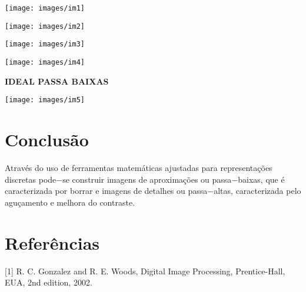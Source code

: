 \documentclass[conference]{IEEEtran}
\begin{document}
		\vspace{2\baselineskip}\vspace{-\parskip}
		\begin{minipage}{\linewidth}
  		\centering
  		\texttt{[image: images/im1]}
		\end{minipage}
		

		\begin{minipage}{\linewidth}
  		\centering
  		\texttt{[image: images/im2]}
		\end{minipage}
 		

		\begin{minipage}{\linewidth}
  		\centering
  		\texttt{[image: images/im3]}
		\end{minipage}
 		
 
		\begin{minipage}{\linewidth}
  		\centering
  		\texttt{[image: images/im4]}
		\end{minipage}		
 		
\centering
\textbf{IDEAL PASSA BAIXAS}

		\begin{minipage}{\linewidth}
  		\centering
  		\texttt{[image: images/im5]}
		\end{minipage}
		 		

	
\section{Conclus\~ao} 
\label{sec:meth} 

Atrav\'es do uso de ferramentas matem\'aticas ajustadas para representa\c{c}\~oes discretas pode$-$se construir imagens de aproxima\c{c}\~oes ou passa$-$baixas, que \'e caracterizada por borrar e imagens de detalhes ou passa$-$altas, caracterizada pelo agu\c{c}amento e melhora do contraste.

\section{Refer\^encias} 
\label{sec:meth} 

[1] R. C. Gonzalez and R. E. Woods, Digital Image Processing,
Prentice-Hall, EUA, 2nd edition, 2002.
\end{document}
